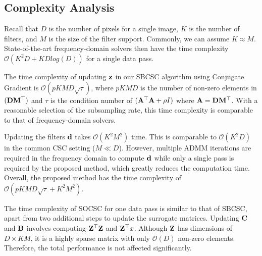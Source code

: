 \subsection{Complexity Analysis}
Recall that $D$ is the number of pixels for a single image, $K$ is the
number of filters, and $M$ is the size of the filter
support. Commonly, we can assume $K \approx M$.  State-of-the-art
frequency-domain solvers then have the time complexity
$\mathcal{O}(K^2D + KDlog(D))$ for a single data pass.

The time complexity of updating $\code$ in our SBCSC algorithm using
Conjugate Gradient is $\mathcal{O}(pKMD \sqrt{\tau})$, where $pKMD$ is
the number of non-zero elements in $(\Filter \mask^\top)$ and $\tau$
is the condition number of $(\matA^\top \matA + \rho I)$ where $\matA
= \Filter \mask^\top$. With a reasonable selection of the subsampling
rate, this time complexity is comparable to that of frequency-domain
solvers.

Updating the filters $\filter$ takes $\mathcal{O}(K^2M^2)$ time. This
is comparable to $\mathcal{O}(K^2D)$ in the common CSC setting ($M \ll
D$). However, multiple ADMM iterations are required in the frequency
domain to compute $\filter$ while only a single pass is required by
the proposed method, which greatly reduces the computation
time. Overall, the proposed method has the time complexity of
$\mathcal{O}(pKMD \sqrt{\tau} + K^2M^2)$.

The time complexity of SOCSC for one data pass is similar to that of SBCSC, apart from
two additional steps to update the surrogate matrices. Updating
$\surC$ and $\surB$ involves computing $\Code^\top\Code$ and
$\Code^\top x$. Although $\Code$ has dimensions of $D \times KM$, it
is a highly sparse matrix with only $\mathcal{O}(D)$ non-zero
elements. Therefore, the total performance is not affected
significantly.



